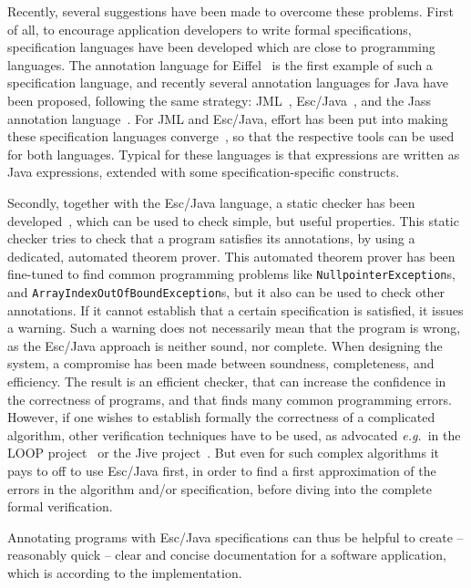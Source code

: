 \documentclass[a4paper]{llncs}
\begin{document}
Recently, several suggestions have been made to overcome these
problems. First of all, to encourage application developers to write
formal specifications, specification languages have been developed
which are close to programming languages. The annotation language for
Eiffel~\cite{Meyer97} is the first example of such a specification
language, and recently several annotation languages for Java have been
proposed, following the same strategy:
JML~\cite{LeavensBR99}, Esc/Java~\cite{ESCJavaUrl}, and
the Jass annotation language~\cite{JassUrl}. For JML and Esc/Java,
effort has been put into making these specification languages
converge~\cite{EscJmlDiff}, so that the respective tools can be used
for both languages. Typical for these languages is that
expressions are written as Java expressions, extended with some
specification-specific constructs.

Secondly, together with the Esc/Java language, a static checker has
been developed~\cite{ESCJavaUrl}, which can be used to check simple,
but useful properties. This static checker tries to check that a
program satisfies its annotations, by using a dedicated, automated
theorem prover. This automated theorem prover has been fine-tuned to
find common programming problems like
\texttt{Null\-pointer\-Exception}s, and
\texttt{Array\-Index\-Out\-Of\-Bound\-Exception}s, but it also can be
used to check other annotations. If it cannot establish that a certain
specification is satisfied, it issues a warning. Such a warning does
not necessarily mean that the program is wrong, as the Esc/Java
approach is neither sound, nor complete. When designing the system, a
compromise has been made between soundness, completeness, and
efficiency. The result is an efficient checker, that can increase the
confidence in the correctness of programs, and that finds many common
programming errors. However, if one wishes to establish formally the
correctness of a complicated algorithm, other verification techniques
have to be used, as advocated \emph{e.g.}~in the LOOP
project~\cite{LOOPUrl} or the Jive project~\cite{MeyerP00}. But even
for such complex algorithms it pays to off to use Esc/Java first, in
order to find a first approximation of the errors in the algorithm
and/or specification, before diving into the complete formal
verification.

Annotating programs with Esc/Java specifications can thus be helpful
to create -- reasonably quick -- clear and concise documentation for
a software application, which is according to the implementation.
\end{document}
